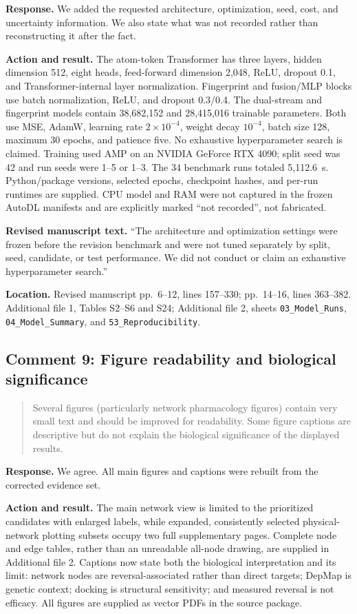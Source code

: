 \documentclass[10pt]{article}
\newenvironment{reviewcomment}{%
  \begin{quote}\small\itshape\color{black}
}{\end{quote}}
\newcommand{\Response}{\textbf{Response.} }
\newcommand{\Action}{\textbf{Action and result.} }
\newcommand{\RevisedText}{\textbf{Revised manuscript text.} }
\newcommand{\Location}{\textbf{Location.} }
\newcommand{\qtext}[1]{``#1''}
\begin{document}
\Response We added the requested architecture, optimization, seed, cost, and uncertainty information. We also state what was not recorded rather than reconstructing it after the fact.

\Action The atom-token Transformer has three layers, hidden dimension 512, eight heads, feed-forward dimension 2,048, ReLU, dropout 0.1, and Transformer-internal layer normalization. Fingerprint and fusion/MLP blocks use batch normalization, ReLU, and dropout 0.3/0.4. The dual-stream and fingerprint models contain 38,682,152 and 28,415,016 trainable parameters. Both use MSE, AdamW, learning rate $2\times10^{-4}$, weight decay $10^{-4}$, batch size 128, maximum 30 epochs, and patience five. No exhaustive hyperparameter search is claimed. Training used AMP on an NVIDIA GeForce RTX 4090; split seed was 42 and run seeds were 1--5 or 1--3. The 34 benchmark runs totaled 5,112.6~s. Python/package versions, selected epochs, checkpoint hashes, and per-run runtimes are supplied. CPU model and RAM were not captured in the frozen AutoDL manifests and are explicitly marked \qtext{not recorded}, not fabricated.

\RevisedText \qtext{The architecture and optimization settings were frozen before the revision benchmark and were not tuned separately by split, seed, candidate, or test performance. We did not conduct or claim an exhaustive hyperparameter search.}

\Location Revised manuscript pp.~6--12, lines 157--330; pp.~14--16, lines 363--382. Additional file 1, Tables S2--S6 and S24; Additional file 2, sheets \texttt{03\_Model\_Runs}, \texttt{04\_Model\_Summary}, and \texttt{53\_Reproducibility}.

\subsection*{Comment 9: Figure readability and biological significance}
\begin{reviewcomment}
Several figures (particularly network pharmacology figures) contain very small text and should be improved for readability. Some figure captions are descriptive but do not explain the biological significance of the displayed results.
\end{reviewcomment}

\Response We agree. All main figures and captions were rebuilt from the corrected evidence set.

\Action The main network view is limited to the prioritized candidates with enlarged labels, while expanded, consistently selected physical-network plotting subsets occupy two full supplementary pages. Complete node and edge tables, rather than an unreadable all-node drawing, are supplied in Additional file 2. Captions now state both the biological interpretation and its limit: network nodes are reversal-associated rather than direct targets; DepMap is genetic context; docking is structural sensitivity; and measured reversal is not efficacy. All figures are supplied as vector PDFs in the source package.
\end{document}
